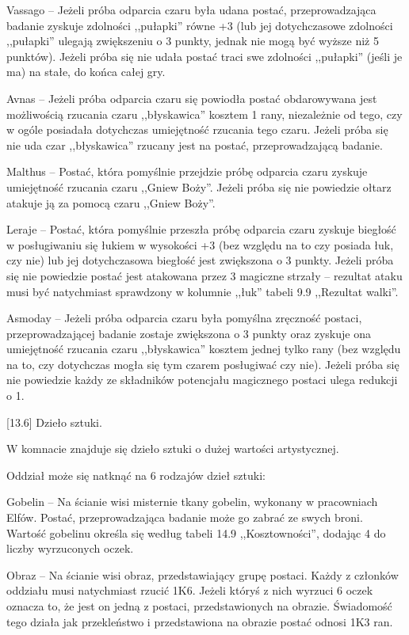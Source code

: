Vassago – Jeżeli próba odparcia czaru była udana postać, przeprowadzająca badanie zyskuje zdolności ,,pułapki'' równe +3 (lub jej dotychczasowe zdolności ,,pułapki'' ulegają zwiększeniu o 3 punkty, jednak nie mogą być wyższe niż 5 punktów).
Jeżeli próba się nie udała postać traci swe zdolności ,,pułapki'' (jeśli je ma) na stałe, do końca całej gry.

Avnas – Jeżeli próba odparcia czaru się powiodła postać obdarowywana jest możliwością rzucania czaru ,,błyskawica'' kosztem 1 rany, niezależnie od tego, czy w ogóle posiadała dotychczas umiejętność rzucania tego czaru.
Jeżeli próba się nie uda czar ,,błyskawica'' rzucany jest na postać, przeprowadzającą badanie.

Malthus – Postać, która pomyślnie przejdzie próbę odparcia czaru zyskuje umiejętność rzucania czaru ,,Gniew Boży''.
Jeżeli próba się nie powiedzie ołtarz atakuje ją za pomocą czaru ,,Gniew Boży''.

Leraje – Postać, która pomyślnie przeszła próbę odparcia czaru zyskuje biegłość w posługiwaniu się łukiem w wysokości +3 (bez względu na to czy posiada łuk, czy nie) lub jej dotychczasowa biegłość jest zwiększona o 3 punkty.
Jeżeli próba się nie powiedzie postać jest atakowana przez 3 magiczne strzały – rezultat ataku musi być natychmiast sprawdzony w kolumnie ,,łuk'' tabeli 9.9 ,,Rezultat walki''.

Asmoday – Jeżeli próba odparcia czaru była pomyślna zręczność postaci, przeprowadzającej badanie zostaje zwiększona o 3 punkty oraz zyskuje ona umiejętność rzucania czaru ,,błyskawica'' kosztem jednej tylko rany (bez względu na to, czy dotychczas mogła się tym czarem posługiwać czy nie).
Jeżeli próba się nie powiedzie każdy ze składników potencjału magicznego postaci ulega redukcji o 1.

[13.6] Dzieło sztuki.

W komnacie znajduje się dzieło sztuki o dużej wartości artystycznej.

Oddział może się natknąć na 6 rodzajów dzieł sztuki:

Gobelin – Na ścianie wisi misternie tkany gobelin, wykonany w pracowniach Elfów.
Postać, przeprowadzająca badanie może go zabrać ze swych broni.
Wartość gobelinu określa się według tabeli 14.9 ,,Kosztowności'', dodając 4 do liczby wyrzuconych oczek.

Obraz – Na ścianie wisi obraz, przedstawiający grupę postaci.
Każdy z członków oddziału musi natychmiast rzucić 1K6.
Jeżeli któryś z nich wyrzuci 6 oczek oznacza to, że jest on jedną z postaci, przedstawionych na obrazie.
Świadomość tego działa jak przekleństwo i przedstawiona na obrazie postać odnosi 1K3 ran.

